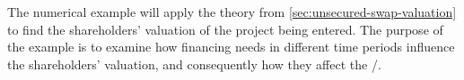 \documentclass[main.tex]{subfiles}
\begin{document}
        The numerical example will apply the theory from \cref{sec:unsecured-swap-valuation}
        to find the shareholders' valuation of the project being entered.
        The purpose of the example is to examine how financing needs
        in different time periods influence the shareholders' valuation,
        and consequently how they affect the \FVA/.
\end{document}
